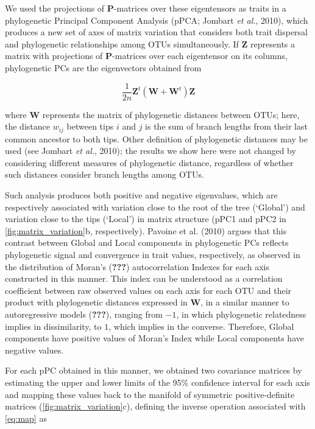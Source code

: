 \documentclass[12pt,twoside]{report}
\begin{document}
We used the projections of $\mathbf{P}$-matrices over these eigentensors
as traits in a phylogenetic Principal Component Analysis (pPCA; Jombart
\emph{et al.}, 2010), which produces a new set of axes of matrix
variation that considers both trait dispersal and phylogenetic
relationships among OTUs simultaneously. If $\mathbf{Z}$ represents a
matrix with projections of $\mathbf{P}$-matrices over each eigentensor
on its columns, phylogenetic PCs are the eigenvectors obtained from

\begin{equation}
\frac{1}{2n} \mathbf{Z}^t(\mathbf{W} + \mathbf{W}^t) \mathbf{Z}
\end{equation}

where $\mathbf{W}$ represents the matrix of phylogenetic distances
between OTUs; here, the distance $w_{ij}$ between tips $i$ and $j$ is
the sum of branch lengths from their last common ancestor to both tips.
Other definition of phylogenetic distances may be used (see Jombart
\emph{et al.}, 2010); the results we show here were not changed by
considering different measures of phylogenetic distance, regardless of
whether such distances consider branch lengths among OTUs.

Such analysis produces both positive and negative eigenvalues, which are
respectively associated with variation close to the root of the tree
(`Global') and variation close to the tips (`Local') in matrix structure
(pPC1 and pPC2 in \autoref{fig:matrix_variation}b, respectively).
Pavoine et al. (2010) argues that this contrast between Global and Local
components in phylogenetic PCs reflects phylogenetic signal and
convergence in trait values, respectively, as observed in the
distribution of Moran's ({\textbf{???}}) autocorrelation Indexes for
each axis constructed in this manner. This index can be understood as a
correlation coefficient between raw observed values on each axis for
each OTU and their product with phylogenetic distances expressed in
$\mathbf{W}$, in a similar manner to autoregressive models
({\textbf{???}}), ranging from $-1$, in which phylogenetic relatedness
implies in dissimilarity, to $1$, which implies in the converse.
Therefore, Global components have positive values of Moran's Index while
Local components have negative values.

For each pPC obtained in this manner, we obtained two covariance
matrices by estimating the upper and lower limits of the 95\% confidence
interval for each axis and mapping these values back to the manifold of
symmetric positive-definite matrices (\autoref{fig:matrix_variation}c),
defining the inverse operation associated with \autoref{eq:map} as
\end{document}
